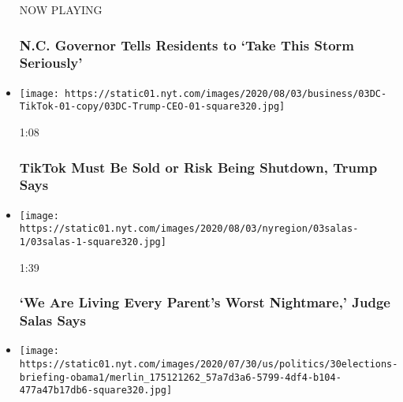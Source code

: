 \begin{itemize}
  NOW PLAYING

  \hypertarget{nc-governor-tells-residents-to-take-this-storm-seriously-2}{%
  \subsubsection{N.C. Governor Tells Residents to `Take This Storm
  Seriously'}\label{nc-governor-tells-residents-to-take-this-storm-seriously-2}}
\item
  \href{https://www.nytimes.com/video/us/100000007270771/trump-tiktok-shutdown-microsoft.html?action=click\&module=video-series-bar\&region=header\&pgtype=Article\&playlistId=video/u-s}{}

  \texttt{[image: https://static01.nyt.com/images/2020/08/03/business/03DC-TikTok-01-copy/03DC-Trump-CEO-01-square320.jpg]}

  1:08

  \hypertarget{tiktok-must-be-sold-or-risk-being-shutdown-trump-says}{%
  \subsubsection{TikTok Must Be Sold or Risk Being Shutdown, Trump
  Says}\label{tiktok-must-be-sold-or-risk-being-shutdown-trump-says}}
\item
  \href{https://www.nytimes.com/video/us/100000007269993/judge-salas-new-jersey.html?action=click\&module=video-series-bar\&region=header\&pgtype=Article\&playlistId=video/u-s}{}

  \texttt{[image: https://static01.nyt.com/images/2020/08/03/nyregion/03salas-1/03salas-1-square320.jpg]}

  1:39

  \hypertarget{we-are-living-every-parents-worst-nightmare-judge-salas-says}{%
  \subsubsection{`We Are Living Every Parent's Worst Nightmare,' Judge
  Salas
  Says}\label{we-are-living-every-parents-worst-nightmare-judge-salas-says}}
\item
  \href{https://www.nytimes.com/video/us/100000007264733/obama-john-lewis-funeral.html?action=click\&module=video-series-bar\&region=header\&pgtype=Article\&playlistId=video/u-s}{}

  \texttt{[image: https://static01.nyt.com/images/2020/07/30/us/politics/30elections-briefing-obama1/merlin\_175121262\_57a7d3a6-5799-4df4-b104-477a47b17db6-square320.jpg]}


\end{itemize}
